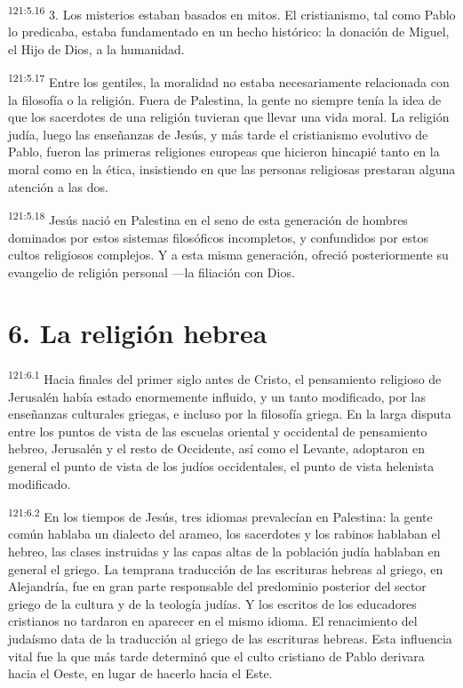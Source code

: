 \par 
\textsuperscript{121:5.16} 3. Los misterios estaban basados en mitos. El cristianismo, tal como Pablo lo predicaba, estaba fundamentado en un hecho histórico: la donación de Miguel, el Hijo de Dios, a la humanidad.

\par 
\textsuperscript{121:5.17} Entre los gentiles, la moralidad no estaba necesariamente relacionada con la filosofía o la religión. Fuera de Palestina, la gente no siempre tenía la idea de que los sacerdotes de una religión tuvieran que llevar una vida moral. La religión judía, luego las enseñanzas de Jesús, y más tarde el cristianismo evolutivo de Pablo, fueron las primeras religiones europeas que hicieron hincapié tanto en la moral como en la ética, insistiendo en que las personas religiosas prestaran alguna atención a las dos.

\par 
\textsuperscript{121:5.18} Jesús nació en Palestina en el seno de esta generación de hombres dominados por estos sistemas filosóficos incompletos, y confundidos por estos cultos religiosos complejos. Y a esta misma generación, ofreció posteriormente su evangelio de religión personal ---la filiación con Dios.

\section*{6. La religión hebrea}
\par 
\textsuperscript{121:6.1} Hacia finales del primer siglo antes de Cristo, el pensamiento religioso de Jerusalén había estado enormemente influido, y un tanto modificado, por las enseñanzas culturales griegas, e incluso por la filosofía griega. En la larga disputa entre los puntos de vista de las escuelas oriental y occidental de pensamiento hebreo, Jerusalén y el resto de Occidente, así como el Levante, adoptaron en general el punto de vista de los judíos occidentales, el punto de vista helenista modificado.

\par 
\textsuperscript{121:6.2} En los tiempos de Jesús, tres idiomas prevalecían en Palestina: la gente común hablaba un dialecto del arameo, los sacerdotes y los rabinos hablaban el hebreo, las clases instruidas y las capas altas de la población judía hablaban en general el griego. La temprana traducción de las escrituras hebreas al griego, en Alejandría, fue en gran parte responsable del predominio posterior del sector griego de la cultura y de la teología judías. Y los escritos de los educadores cristianos no tardaron en aparecer en el mismo idioma. El renacimiento del judaísmo data de la traducción al griego de las escrituras hebreas. Esta influencia vital fue la que más tarde determinó que el culto cristiano de Pablo derivara hacia el Oeste, en lugar de hacerlo hacia el Este.

